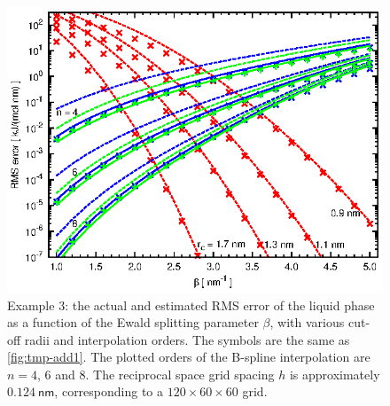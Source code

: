 \documentclass[journal=jacsat,manuscript=article]{achemso}
\begin{document}
\begin{figure}
  \centering
  \includegraphics[]{fig.order.ik.ana.eps}
  \caption{Example 3: the actual and estimated RMS error of the liquid
    phase as a function of the Ewald splitting parameter $\beta$,
    with various cut-off radii and interpolation orders.
    The symbols are the same as \ref{fig:tmp-add1}.
    The plotted orders of the B-spline interpolation are $n=4$, 6 and 8.
    The reciprocal space grid spacing $h$ is approximately
    $0.124\:\textsf{nm}$, corresponding to
    a $120\times 60\times 60$ grid.
  }
  \label{fig:tmp-add2}
\end{figure}
\end{document}
